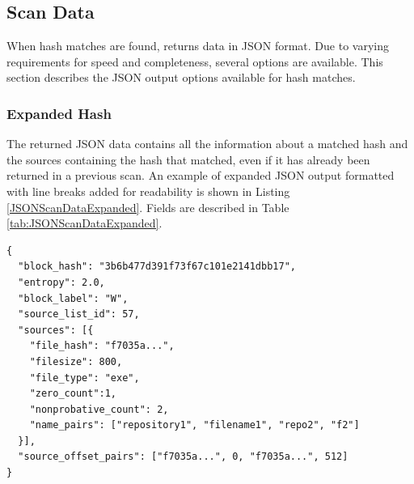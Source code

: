 \documentclass[11pt,fleqn]{article} %
\begin{document}
\subsection{Scan Data}
\label{ScanData}
When hash matches are found, \hdb returns data in JSON format. Due to varying requirements for speed and completeness, several options are available. This section describes the JSON output options available for hash matches.\\

\subsubsection{Expanded Hash}
The returned JSON data contains all the information about a matched hash and the sources containing the hash that matched, even if it has already been returned in a previous scan. An example of expanded JSON output formatted with line breaks added for readability is shown in Listing \ref{JSONScanDataExpanded}. Fields are described in Table \ref{tab:JSONScanDataExpanded}.\\

\lstset{style=customfile}
\begin{lstlisting}[float, caption={Example JSON block hash expanded data output from a scan match, with line breaks added for readability}, label=JSONScanDataExpanded]
{
  "block_hash": "3b6b477d391f73f67c101e2141dbb17",
  "entropy": 2.0,
  "block_label": "W",
  "source_list_id": 57,
  "sources": [{
    "file_hash": "f7035a...",
    "filesize": 800,
    "file_type": "exe",
    "zero_count":1,
    "nonprobative_count": 2,
    "name_pairs": ["repository1", "filename1", "repo2", "f2"]
  }],
  "source_offset_pairs": ["f7035a...", 0, "f7035a...", 512]
}
\end{lstlisting}
\end{document}
